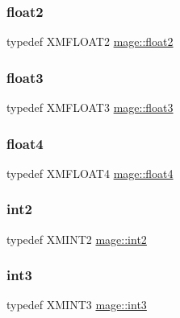\hypertarget{namespacemage_a536f5856288c280080c9cdf739e85ddc}{}\label{namespacemage_a536f5856288c280080c9cdf739e85ddc} 
\subsubsection{\texorpdfstring{float2}{float2}}
{\footnotesize\ttfamily typedef X\+M\+F\+L\+O\+A\+T2 \hyperlink{namespacemage_a536f5856288c280080c9cdf739e85ddc}{mage\+::float2}}

\hypertarget{namespacemage_aab5dae4b0aaf8129b9e0d651d91d4b38}{}\label{namespacemage_aab5dae4b0aaf8129b9e0d651d91d4b38} 
\subsubsection{\texorpdfstring{float3}{float3}}
{\footnotesize\ttfamily typedef X\+M\+F\+L\+O\+A\+T3 \hyperlink{namespacemage_aab5dae4b0aaf8129b9e0d651d91d4b38}{mage\+::float3}}

\hypertarget{namespacemage_aa79484ea5211c29727b3794199ac0a55}{}\label{namespacemage_aa79484ea5211c29727b3794199ac0a55} 
\subsubsection{\texorpdfstring{float4}{float4}}
{\footnotesize\ttfamily typedef X\+M\+F\+L\+O\+A\+T4 \hyperlink{namespacemage_aa79484ea5211c29727b3794199ac0a55}{mage\+::float4}}

\hypertarget{namespacemage_aa22600b49377872988582e782d7b1fcd}{}\label{namespacemage_aa22600b49377872988582e782d7b1fcd} 
\subsubsection{\texorpdfstring{int2}{int2}}
{\footnotesize\ttfamily typedef X\+M\+I\+N\+T2 \hyperlink{namespacemage_aa22600b49377872988582e782d7b1fcd}{mage\+::int2}}

\hypertarget{namespacemage_a80c7f9de83dfbbd55bbf339dbcbd99cc}{}\label{namespacemage_a80c7f9de83dfbbd55bbf339dbcbd99cc} 
\subsubsection{\texorpdfstring{int3}{int3}}
{\footnotesize\ttfamily typedef X\+M\+I\+N\+T3 \hyperlink{namespacemage_a80c7f9de83dfbbd55bbf339dbcbd99cc}{mage\+::int3}}

